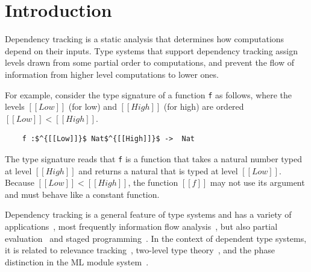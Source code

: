\documentclass[acmsmall]{acmart}
\begin{document}

\maketitle

\section{Introduction}\label{sec:intro}
Dependency tracking is a static analysis that determines how computations
depend on their inputs. Type systems that support dependency tracking assign
levels drawn from some partial order to computations, and prevent the flow of
information from higher level computations to lower ones.

For example, consider the type signature of a function \lstinline{f}
as follows, where the levels $[[Low]]$ (for low) and $[[High]]$ (for high) are ordered
$[[Low]] < [[High]]$. 
\begin{lstlisting}
    f :$^{[[Low]]}$ Nat$^{[[High]]}$ ->  Nat
\end{lstlisting}
The type signature reads that \lstinline{f} is a function
that takes a natural number typed at level $[[High]]$ and returns a natural that is
typed at level $[[Low]]$. Because $[[Low]] < [[High]]$,
the function $[[f]]$ may not use its argument and must behave like a constant
function.

Dependency tracking is a general feature of type systems and has a variety of
applications~\citep{abadi1999core}, most frequently information flow
analysis~\citep{denning1977infoflow, sabelfeld2003language}, but also partial
evaluation~\citep{hatcliff_danvy_1997} and staged
programming~\citep{sheard1995staged, taha2000metaml}. In the context of
dependent type systems, it is related to relevance
tracking~\citep{debruijn1994automath,miquel:icc,mishra2008erasure,choudhury:ddc},
two-level type theory~\citep{annenkov2023two}, and the phase distinction in the
ML module system~\citep{sterling-harper:phase-distinction}.
\end{document}
